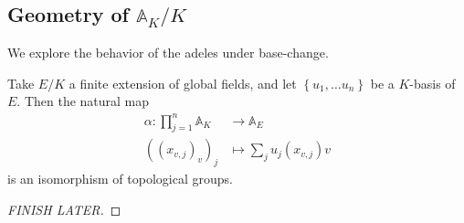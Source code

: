 \documentclass[11pt, x11names]{article}
\renewcommand{\aa}{\mathbb{A}}
\newcommand{\set}[1]{\left\{ #1 \right\}}
\begin{document}
\subsection{Geometry of $\aa_K/K$}
\label{subsection: Geometry of A_K/K}
We explore the behavior of the adeles under base-change.
\begin{lemma}
\label{A_K/K Lemma}
Take $E/K$ a finite extension of global fields, and let $\set{u_1, \ldots u_n}$ be a $K$-basis of $E$. Then the natural map
\begin{equation*}
    \begin{split}
    \alpha: \prod^n_{j=1} \aa_K &\to \aa_E\\
    ((x_{v, j})_v)_j &\mapsto \sum_j u_j(x_{v, j})v
    \end{split}
\end{equation*}
is an isomorphism of topological groups.
\end{lemma}
\begin{proof}
[FINISH LATER]
\end{proof}
\end{document}
